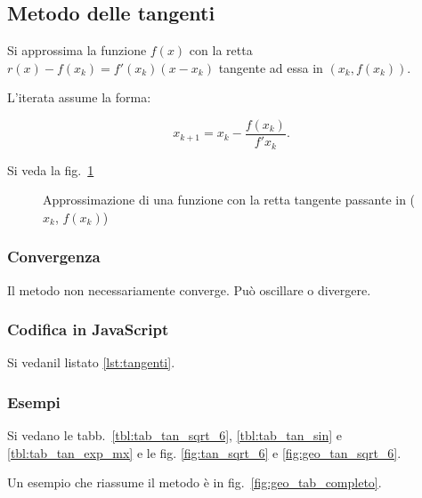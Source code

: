 \subsection{Metodo delle tangenti}

Si approssima la funzione $f(x)$ con la retta $r(x) - f(x_k) = f'(x_k) (x - x_k)$ tangente ad essa in $(x_k, f(x_k))$.

L'iterata assume la forma:

$$x_{k+1} = x_k - \frac{f(x_k)}{f'{x_k}}.$$

Si veda la fig.~\ref{fig:retta_tangente}

\begin{figure}[!htbp]
    \begin{center}
        
        \caption{Approssimazione di una funzione con la retta tangente passante in ($x_k$, $f(x_k)$)}
        \label{fig:retta_tangente}
    \end{center}
\end{figure}


\subsubsection{Convergenza}

Il metodo non necessariamente converge.
Può oscillare o divergere.

\subsubsection{Codifica in JavaScript}


Si vedanil listato \ref{lst:tangenti}.

\begin{lstfloat}
    
    \caption{Descrizione in JavaScript del metodo delle tangenti}
    \label{lst:tangenti}
\end{lstfloat}

\subsubsection{Esempi}

Si vedano le tabb.~\ref{tbl:tab_tan_sqrt_6}, \ref{tbl:tab_tan_sin} e \ref{tbl:tab_tan_exp_mx} e le fig. \ref{fig:tan_sqrt_6} e \ref{fig:geo_tan_sqrt_6}.

Un esempio che riassume il metodo è in fig.~\ref{fig:geo_tab_completo}.

